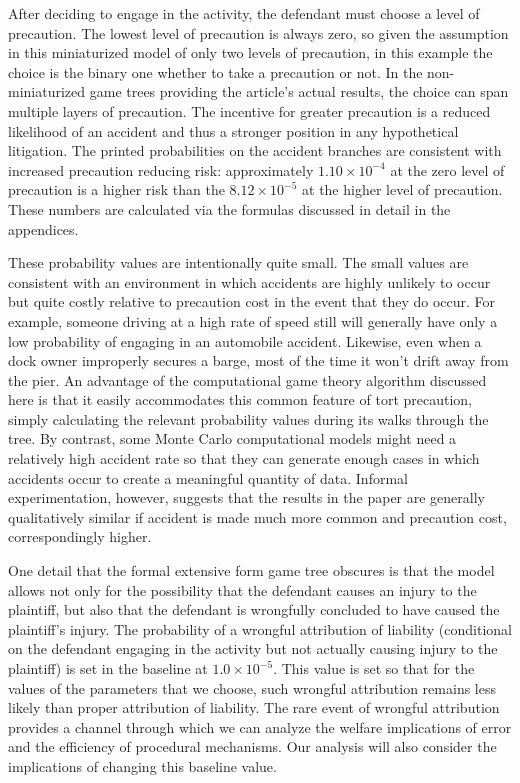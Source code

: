 \documentclass{article}
\begin{document}
After deciding to engage in the activity, the defendant must choose a level of precaution. The lowest level of precaution is always zero, so given the assumption in this miniaturized model of only two levels of precaution, in this example the choice is the binary one whether to take a precaution or not. In the non-miniaturized game trees providing the article's actual results, the choice can span multiple layers of precaution. The incentive for greater precaution is a reduced likelihood of an accident and thus a stronger position in any hypothetical litigation. The printed probabilities on the accident branches are consistent with increased precaution reducing risk: approximately $1.10 \times 10^{-4}$ at the zero level of precaution is a higher risk than the $8.12 \times 10^{-5}$ at the higher level of precaution. These numbers are calculated via the formulas discussed in detail in the appendices.

These probability values are intentionally quite small. The small values are consistent with an environment in which accidents are highly unlikely to occur but quite costly relative to precaution cost in the event that they do occur. For example, someone driving at a high rate of speed still will generally have only a low probability of engaging in an automobile accident. Likewise, even when a dock owner improperly secures a barge, most of the time it won't drift away from the pier. An advantage of the computational game theory algorithm discussed here is that it easily accommodates this common feature of tort precaution, simply calculating the relevant probability values during its walks through the tree. By contrast, some Monte Carlo computational models might need a relatively high accident rate so that they can generate enough cases in which accidents occur to create a meaningful quantity of data. Informal experimentation, however, suggests that the results in the paper are generally qualitatively similar if accident is made much more common and precaution cost, correspondingly higher.

One detail that the formal extensive form game tree obscures is that the model allows not only for the possibility that the defendant causes an injury to the plaintiff, but also that the defendant is wrongfully concluded to have caused the plaintiff's injury. The probability of a wrongful attribution of liability (conditional on the defendant engaging in the activity but not actually causing injury to the plaintiff) is set in the baseline at $1.0 \times 10^{-5}$. This value is set so that for the values of the parameters that we choose, such wrongful attribution remains less likely than proper attribution of liability. The rare event of wrongful attribution provides a channel through which we can analyze the welfare implications of error and the efficiency of procedural mechanisms. Our analysis will also consider the implications of changing this baseline value.
\end{document}
